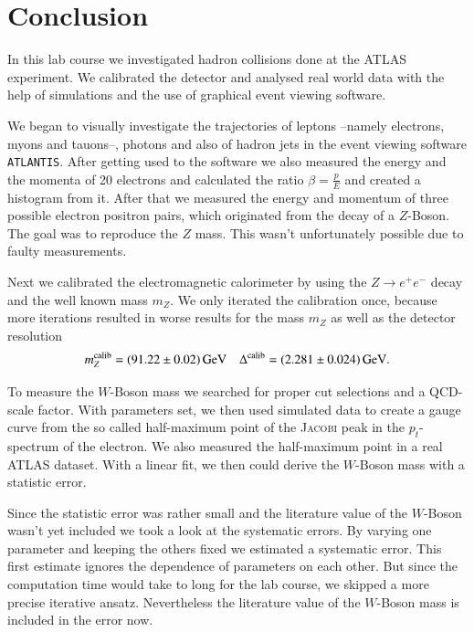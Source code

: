 \documentclass[11pt,a4paper,notitlepage]{scrartcl}
\begin{document}
\newpage

\section{Conclusion}
In this lab course we investigated hadron collisions done at the ATLAS experiment. We calibrated the detector and analysed real world data with the help of simulations and the use of graphical event viewing software.

We began to visually investigate the trajectories of leptons --namely electrons, myons and tauons--, photons and also of hadron jets in the event viewing software \texttt{ATLANTIS}. After getting used to the software we also measured the energy and the momenta of 20 electrons and calculated the ratio $\beta=\frac{p}{E}$ and created a histogram from it. 
After that we measured the energy and momentum of three possible electron positron pairs, which originated from the decay of a $Z$-Boson. The goal was to reproduce the $Z$ mass. This wasn't unfortunately possible due to faulty measurements.

Next we calibrated the electromagnetic calorimeter by using the $Z\to e^+e^-$ decay and the well known mass $m_Z$. We only iterated the calibration once, because more iterations resulted in worse results for the mass $m_Z$ as well as the detector resolution
\begin{align*}
	m_Z^{\text{calib}}=\SI{91.22\pm0.02}{\giga\eV} && \Delta^\text{calib}=\SI{2.281\pm0.024}{\giga\eV}.
\end{align*}

To measure the $W$-Boson mass we searched for proper cut selections and a QCD-scale factor. With parameters set, we then used simulated data to create a gauge curve from the so called half-maximum point of the \textsc{Jacobi} peak in the $p_t$-spectrum of the electron. We also measured the half-maximum point in a real ATLAS dataset. With a linear fit, we then could derive the $W$-Boson mass with a statistic error.

Since the statistic error was rather small and the literature value of the $W$-Boson wasn't yet included we took a look at the systematic errors. By varying one parameter and keeping the others fixed we estimated a systematic error. This first estimate ignores the dependence of parameters on each other. But since the computation time would take to long for the lab course, we skipped a more precise iterative ansatz. Nevertheless the literature value of the $W$-Boson mass is included in the error now.
\end{document}

